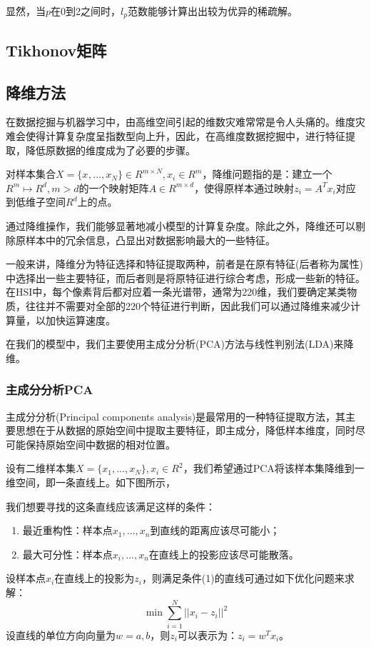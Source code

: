 \documentclass[12pt,a4paper]{article}
\begin{document}
显然，当$p$在0到2之间时，$l_{p}$范数能够计算出出较为优异的稀疏解。


\subsection{Tikhonov矩阵}

\subsection{降维方法}
在数据挖掘与机器学习中，由高维空间引起的维数灾难常常是令人头痛的。维度灾难会使得计算复杂度呈指数型向上升，因此，在高维度数据挖掘中，进行特征提取，降低原数据的维度成为了必要的步骤。

\begin{definition}
对样本集合$X = \{x_{}, ..., x_{N}\} \in R^{m \times N}, x_{i} \in R^{m}$，降维问题指的是：建立一个$R^{m} \longmapsto R^{d}, m > d$的一个映射矩阵$A \in R^{m \times d}$，使得原样本通过映射$z_{i} = A^{T}x_{i}$对应到低维子空间$R^{d}$上的点。
\end{definition}

通过降维操作，我们能够显著地减小模型的计算复杂度。除此之外，降维还可以剔除原样本中的冗余信息，凸显出对数据影响最大的一些特征。

一般来讲，降维分为特征选择和特征提取两种，前者是在原有特征(后者称为属性)中选择出一些主要特征，而后者则是将原特征进行综合考虑，形成一些新的特征。在HSI中，每个像素背后都对应着一条光谱带，通常为220维，我们要确定某类物质，往往并不需要对全部的220个特征进行判断，因此我们可以通过降维来减少计算量，以加快运算速度。

在我们的模型中，我们主要使用主成分分析(PCA)方法与线性判别法(LDA)来降维。

\subsubsection{主成分分析PCA}
主成分分析(Principal components analysis)是最常用的一种特征提取方法，其主要思想在于从数据的原始空间中提取主要特征，即主成分，降低样本维度，同时尽可能保持原始空间中数据的相对位置。

设有二维样本集$X = \{x_{1}, ... , x_{N}\}, x_{i} \in R^{2}$，我们希望通过PCA将该样本集降维到一维空间，即一条直线上。如下图所示，
\begin{figure}[H] 
\label{fig:2} 
\end{figure} 
我们想要寻找的这条直线应该满足这样的条件：
\begin{enumerate}[(1)]
\item 最近重构性：样本点$x_{1}, ... , x_{n}$到直线的距离应该尽可能小；
\item 最大可分性：样本点$x_{i}, ... , x_{n}$在直线上的投影应该尽可能散落。
\end{enumerate}
设样本点$x_{i}$在直线上的投影为$z_{i}$，则满足条件(1)的直线可通过如下优化问题来求解：
\begin{equation}
\label{eq16}
\min \sum_{i = 1}^{N}||x_{i} - z_{i}||^{2}
\end{equation}
设直线的单位方向向量为$w = {a, b}$，则$z_{i}$可以表示为：$z_{i} = w^{T}x_{i}$。
\end{document}
